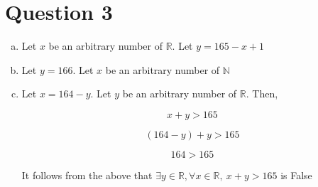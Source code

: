 \documentclass[12pt]{article}
\begin{document}
\section*{Question 3}
\begin{enumerate}[a.]
    \item

    Let $x$ be an arbitrary number of $\mathbb{R}$. Let $y = 165 - x + 1$

    \item

    Let $y = 166$. Let $x$ be an arbitrary number of $\mathbb{N}$

    \item

    Let $x = 164 - y$. Let $y$ be an arbitrary number of $\mathbb{R}$. Then,

    \begin{equation}
        x + y > 165
    \end{equation}

    \begin{equation}
        (164 - y) + y > 165
    \end{equation}

    \begin{equation}
        164 > 165
    \end{equation}

    It follows from the above that $\exists y \in \mathbb{R}, \forall x \in \mathbb{R},\:x+y > 165$ is False

\end{enumerate}
\end{document}
